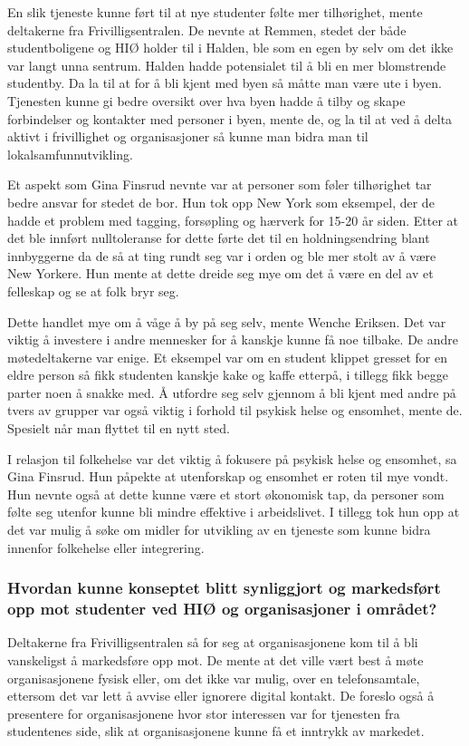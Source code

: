 En slik tjeneste kunne ført til at nye studenter følte mer tilhørighet, mente deltakerne fra Frivilligsentralen. De nevnte at Remmen, stedet der både studentboligene og HIØ holder til i Halden, ble som en egen by selv om det ikke var langt unna sentrum. Halden hadde potensialet til å bli en mer blomstrende studentby. Da la til at for å bli kjent med byen så måtte man være ute i byen. Tjenesten kunne gi bedre oversikt over hva byen hadde å tilby og skape forbindelser og kontakter med personer i byen, mente de, og la til at ved å delta aktivt i frivillighet og organisasjoner så kunne man bidra man til lokalsamfunnutvikling. \cite{FRIVILLIGSENTRALEN-INTERVJU:21}

Et aspekt som Gina Finsrud nevnte var at personer som føler tilhørighet tar bedre ansvar for stedet de bor. Hun tok opp New York som eksempel, der de hadde et problem med tagging, forsøpling og hærverk for 15-20 år siden. Etter at det ble innført nulltoleranse for dette førte det til en holdningsendring blant innbyggerne da de så at ting rundt seg var i orden og ble mer stolt av å være New Yorkere. Hun mente at dette dreide seg mye om det å være en del av et felleskap og se at folk bryr seg. \cite{KOMMUNEN-INTERVJU:20}

Dette handlet mye om å våge å by på seg selv, mente Wenche Eriksen. Det var viktig å investere i andre mennesker for å kanskje kunne få noe tilbake. De andre møtedeltakerne var enige. Et eksempel var om en student klippet gresset for en eldre person så fikk studenten kanskje kake og kaffe etterpå, i tillegg fikk begge parter noen å snakke med. Å utfordre seg selv gjennom å bli kjent med andre på tvers av grupper var også viktig i forhold til psykisk helse og ensomhet, mente de. Spesielt når man flyttet til en nytt sted. \cite{FRIVILLIGSENTRALEN-INTERVJU:21}

I relasjon til folkehelse var det viktig å fokusere på psykisk helse og ensomhet, sa Gina Finsrud. Hun påpekte at utenforskap og ensomhet er roten til mye vondt. Hun nevnte også at dette kunne være et stort økonomisk tap, da personer som følte seg utenfor kunne bli mindre effektive i arbeidslivet.
I tillegg tok hun opp at det var mulig å søke om midler for utvikling av en tjeneste som kunne bidra innenfor folkehelse eller integrering. \cite{KOMMUNEN-INTERVJU:20}

\setlength{\leftskip}{0pt}

\subsubsection{Hvordan kunne konseptet blitt synliggjort og markedsført opp mot studenter ved HIØ og organisasjoner i området?}
Deltakerne fra Frivilligsentralen så for seg at organisasjonene kom til å bli vanskeligst å markedsføre opp mot. De mente at det ville vært best å møte organisasjonene fysisk eller, om det ikke var mulig, over en telefonsamtale, ettersom det var lett å avvise eller ignorere digital kontakt. De foreslo også å presentere for organisasjonene hvor stor interessen var for tjenesten fra studentenes side, slik at organisasjonene kunne få et inntrykk av markedet. \cite{FRIVILLIGSENTRALEN-INTERVJU:21}

